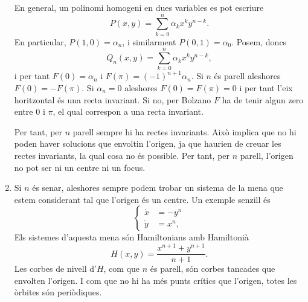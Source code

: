 \documentclass[12pt]{report}
\numberwithin{table}{section}
\numberwithin{equation}{section}
\numberwithin{figure}{section}
\begin{document}
\begin{enumerate}[label=(\roman*), font=\bfseries \sffamily, wide, labelwidth=!, labelindent=0pt]
		En general, un polinomi homogeni en dues variables es pot escriure
		\begin{equation*}
			P(x,y) = \sum_{k = 0}^n \alpha_k x^k y^{n - k}.
		\end{equation*}
		En particular, \( P(1, 0) = \alpha_n \), i similarment \( P(0,1) = \alpha_0 \). Posem, doncs
		\begin{equation*}
			Q_n(x,y) = \sum_{k = 0}^n \alpha_k x^k y^{n - k},
		\end{equation*}
		i per tant \( F(0) = \alpha_n \) i \( F(\pi) = (-1)^{n+1} \alpha_n \). Si \( n \) és parell aleshores \( F(0) = - F(\pi) \). Si \( \alpha_n = 0 \) aleshores \( F(0) = F(\pi) = 0 \) i per tant l'eix horitzontal és una recta invariant. Si no, per Bolzano \( F \) ha de tenir algun zero entre \( 0 \) i \( \pi \), el qual correspon a una recta invariant. 

		Per tant, per \( n \) parell sempre hi ha rectes invariants. Això implica que no hi poden haver solucions que envoltin l'origen, ja que haurien de creuar les rectes invariants, la qual cosa no és possible. Per tant, per \( n \) parell, l'origen no pot ser ni un centre ni un focus.  

	\item Si \( n \) és senar, aleshores sempre podem trobar un sistema de la mena que estem considerant tal que l'origen és un centre. Un exemple senzill és 
		\begin{equation*}
			\left\{ 
				\begin{aligned}
					\dot{x} & = -y^n \\
					\dot{y} & = x^n,
				\end{aligned} 
			\right. 
		\end{equation*}
		Els sistemes d'aquesta mena són Hamiltonians amb Hamiltonià
		\begin{equation*}
			H(x,y) = \frac{x^{n+1} + y^{n+1}}{n + 1}. 
		\end{equation*}
		Les corbes de nivell d'\( H \), com que \( n \) és parell, són corbes tancades que envolten l'origen. I com que no hi ha més punts crítics que l'origen, totes les òrbites són periòdiques. 


\end{enumerate}
\end{document}
